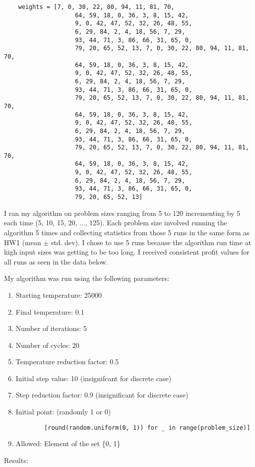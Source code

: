 \documentclass[11pt]{article}
\begin{document}
\begin{enumerate}
\begin{enumerate}
\begin{lstlisting}
	weights = [7, 0, 30, 22, 80, 94, 11, 81, 70,
					64, 59, 18, 0, 36, 3, 8, 15, 42,
					9, 0, 42, 47, 52, 32, 26, 48, 55,
					6, 29, 84, 2, 4, 18, 56, 7, 29,
					93, 44, 71, 3, 86, 66, 31, 65, 0,
					79, 20, 65, 52, 13, 7, 0, 30, 22, 80, 94, 11, 81, 70,
					64, 59, 18, 0, 36, 3, 8, 15, 42,
					9, 0, 42, 47, 52, 32, 26, 48, 55,
					6, 29, 84, 2, 4, 18, 56, 7, 29,
					93, 44, 71, 3, 86, 66, 31, 65, 0,
					79, 20, 65, 52, 13, 7, 0, 30, 22, 80, 94, 11, 81, 70,
					64, 59, 18, 0, 36, 3, 8, 15, 42,
					9, 0, 42, 47, 52, 32, 26, 48, 55,
					6, 29, 84, 2, 4, 18, 56, 7, 29,
					93, 44, 71, 3, 86, 66, 31, 65, 0,
					79, 20, 65, 52, 13, 7, 0, 30, 22, 80, 94, 11, 81, 70,
					64, 59, 18, 0, 36, 3, 8, 15, 42,
					9, 0, 42, 47, 52, 32, 26, 48, 55,
					6, 29, 84, 2, 4, 18, 56, 7, 29,
					93, 44, 71, 3, 86, 66, 31, 65, 0,
					79, 20, 65, 52, 13]
	\end{lstlisting}
	I ran my algorithm on problem sizes ranging from 5 to 120 incrementing by 5 each time (5, 10, 15, 20, ..., 125). Each problem size involved running the algorithm 5 times and collecting statistics from those 5 runs in the same form as HW1 (mean $\pm$ std. dev). I chose to use 5 runs because the algorithm run time at high input sizes was getting to be too long. I received consistent profit values for all runs as seen in the data below. 
	
	My algorithm was run using the following parameters:
	\begin{enumerate}
		\item Starting temperature: 25000
		\item Final temperature: 0.1
		\item Number of iterations: 5
		\item Number of cycles: 20
		\item Temperature reduction factor: 0.5
		\item Initial step value: 10 (insignifcant for discrete case)
		\item Step reduction factor: 0.9 (insignificant for discrete case)
		\item Initial point: (randomly 1 or 0)
		\begin{lstlisting}
		[round(random.uniform(0, 1)) for _ in range(problem_size)]
		\end{lstlisting}
		\item Allowed: Element of the set \{0, 1\}
	\end{enumerate}

	Results:
	


\end{enumerate}
\end{enumerate}
\end{document}
